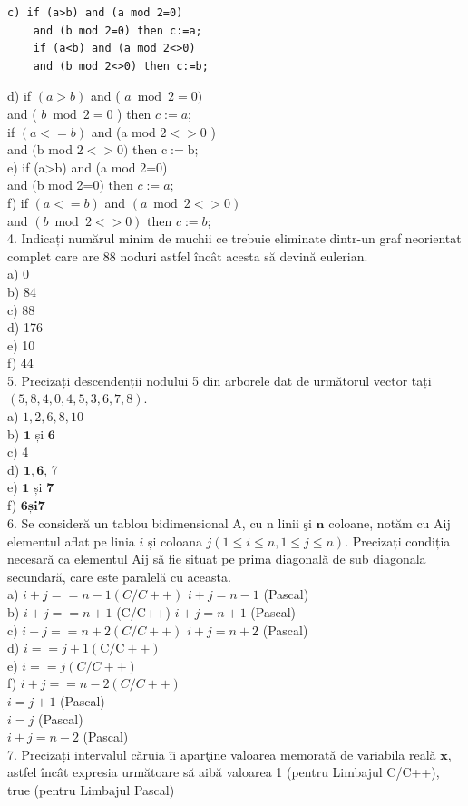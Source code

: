\documentclass[10pt]{article}
\begin{document}
\begin{verbatim}
c) if (a>b) and (a mod 2=0)
    and (b mod 2=0) then c:=a;
    if (a<b) and (a mod 2<>0)
    and (b mod 2<>0) then c:=b;
\end{verbatim}

d) if $(a>b)$ and ( $a \bmod 2=0)$\\
and ( $b \bmod 2=0$ ) then $c:=a$;\\
if $(a<=b)$ and (a mod $2<>0$ )\\
and $(\mathrm{b}$ mod $2<>0)$ then $\mathrm{c}:=\mathrm{b}$;\\
e) if (a>b) and (a mod 2=0)\\
and (b mod 2=0) then $c:=a ;$\\
f) if $(a<=b)$ and $(a \bmod 2<>0)$\\
and $(b \bmod 2<>0)$ then $c:=b$;\\
4. Indicați numărul minim de muchii ce trebuie eliminate dintr-un graf neorientat complet care are 88 noduri astfel încât acesta să devină eulerian.\\
a) 0\\
b) 84\\
c) 88\\
d) 176\\
e) 10\\
f) 44\\
5. Precizați descendenții nodului 5 din arborele dat de următorul vector tați $(5,8,4,0,4,5,3,6,7,8)$.\\
a) $1,2,6,8,10$\\
b) $\mathbf{1}$ și $\mathbf{6}$\\
c) 4\\
d) $\mathbf{1 , 6}$, 7\\
e) $\mathbf{1}$ și $\mathbf{7}$\\
f) $\mathbf{6 s ̦ i} \mathbf{7}$\\
6. Se consideră un tablou bidimensional A, cu n linii şi $\mathbf{n}$ coloane, notăm cu Aij elementul aflat pe linia $i$ și coloana $j(1 \leq i \leq n, 1 \leq j \leq n)$. Precizați condiția necesară ca elementul Aij să fie situat pe prima diagonală de sub diagonala secundară, care este paralelă cu aceasta.\\
a) $i+j==n-1(C / C++)$ $i+j=n-1$ (Pascal)\\
b) $i+j==n+1$ (C/C++) $i+j=n+1$ (Pascal)\\
c) $i+j==n+2(C / C++)$ $i+j=n+2$ (Pascal)\\
d) $i==j+1(\mathrm{C} / \mathrm{C}++)$\\
e) $i==j(C / C++)$\\
f) $i+j==n-2(C / C++)$\\
$i=j+1$ (Pascal)\\
$i=j$ (Pascal)\\
$i+j=n-2$ (Pascal)\\
7. Precizați intervalul căruia îi aparţine valoarea memorată de variabila reală $\mathbf{x}$, astfel încât expresia următoare să aibă valoarea 1 (pentru Limbajul C/C++), true (pentru Limbajul Pascal)
\end{document}
